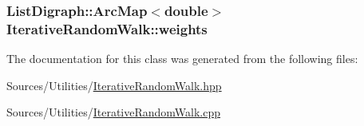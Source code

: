 \hypertarget{class_iterative_random_walk_a94c0548c8109da4fa45aa103489b3082}{
\subsubsection[{weights}]{\setlength{\rightskip}{0pt plus 5cm}List\+Digraph\+::\+Arc\+Map$<$double$>$ Iterative\+Random\+Walk\+::weights\hspace{0.3cm}{\ttfamily [private]}}}\label{class_iterative_random_walk_a94c0548c8109da4fa45aa103489b3082}


The documentation for this class was generated from the following files\+:\begin{DoxyCompactItemize}
\item 
Sources/\+Utilities/\hyperlink{_iterative_random_walk_8hpp}{Iterative\+Random\+Walk.\+hpp}\item 
Sources/\+Utilities/\hyperlink{_iterative_random_walk_8cpp}{Iterative\+Random\+Walk.\+cpp}\end{DoxyCompactItemize}
